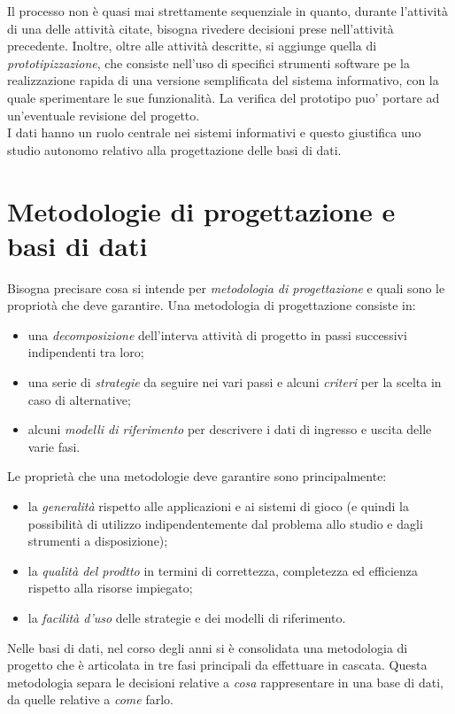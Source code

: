 \documentclass[12pt]{report}
\begin{document}
		Il processo non è quasi mai strettamente sequenziale in quanto, durante l'attività di una delle attività citate, bisogna rivedere decisioni prese nell'attività precedente. Inoltre, oltre alle attività descritte, si aggiunge quella di \textit{prototipizzazione}, che consiste nell'uso di specifici strumenti software pe la realizzazione rapida di una versione semplificata del sistema informativo, con la quale sperimentare le sue funzionalità. La verifica del prototipo puo' portare ad un'eventuale revisione del progetto. \\
		I dati hanno un ruolo centrale nei sistemi informativi e questo giustifica uno studio autonomo relativo alla progettazione delle basi di dati.
		\section{Metodologie di progettazione e basi di dati}
		Bisogna precisare cosa si intende per \textit{metodologia di progettazione} e quali sono le propriotà che deve garantire. Una metodologia di progettazione consiste in:
		\begin{itemize}
			\item una \textit{decomposizione} dell'interva attività di progetto in passi successivi indipendenti tra loro;
			\item una serie di \textit{strategie} da seguire nei vari passi e alcuni \textit{criteri} per la scelta in caso di alternative;
			\item alcuni \textit{modelli di riferimento} per descrivere i dati di ingresso e uscita delle varie fasi.
		\end{itemize}
		Le proprietà che una metodologie deve garantire sono principalmente:
		\begin{itemize}
			\item la \textit{generalità} rispetto alle applicazioni e ai sistemi di gioco (e quindi la possibilità di utilizzo indipendentemente dal problema allo studio e dagli strumenti a disposizione);
			\item la \textit{qualità del prodtto} in termini di correttezza, completezza ed efficienza rispetto alla risorse impiegato;
			\item la \textit{facilità d'uso} delle strategie e dei modelli di riferimento.
		\end{itemize}
		Nelle basi di dati, nel corso degli anni si è consolidata una metodologia di progetto che è articolata in tre fasi principali da effettuare in cascata. Questa metodologia separa le decisioni relative a \textit{cosa} rappresentare in una base di dati, da quelle relative a \textit{come} farlo.
\end{document}
